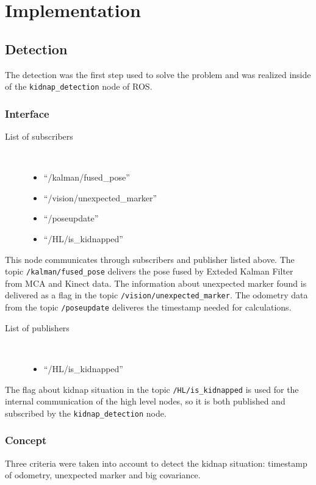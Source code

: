 \section{Implementation} \label{implementation}
\subsection{Detection}
The detection was the first step used to solve the problem and was realized inside of the \texttt{kidnap\_detection} node of ROS. 

\subsubsection{Interface}
\begin{description}
\item[List of subscribers]\
	\begin{itemize}
	\item ``/kalman/fused\_pose'' 
	\item ``/vision/unexpected\_marker'' 
	\item ``/poseupdate'' 
	\item ``/HL/is\_kidnapped''
	\end{itemize}
\end{description}

This node communicates through subscribers and publisher listed above. The topic \texttt{/kalman/fused\_pose} delivers the pose fused by Exteded Kalman Filter from MCA and Kinect data. The information about unexpected marker found is delivered as a flag in the topic \texttt{/vision/unexpected\_marker}. The odometry data from the topic \texttt{/poseupdate} deliveres the timestamp needed for calculations. 

\begin{description}
\item[List of publishers]\
	\begin{itemize}
	\item ``/HL/is\_kidnapped''
	\end{itemize}
\end{description}

The flag about kidnap situation in the topic \texttt{/HL/is\_kidnapped} is used for the internal communication of the high level nodes, so it is both published and subscribed by the \texttt{kidnap\_detection} node.

\subsubsection{Concept}
Three criteria were taken into account to detect the kidnap situation: timestamp of odometry, unexpected marker and big covariance.

